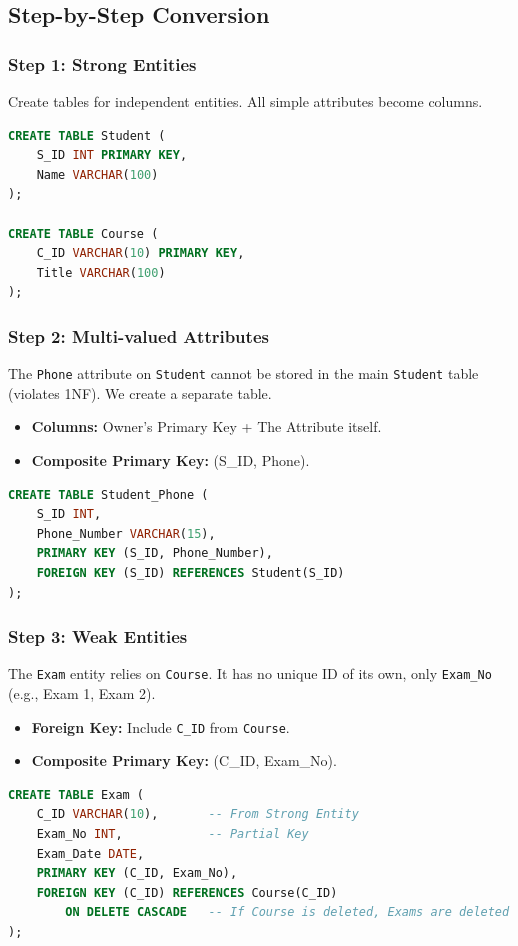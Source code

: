 \documentclass[12pt,a4paper]{article}
\begin{document}
\subsection{Step-by-Step Conversion}

\subsubsection{Step 1: Strong Entities}
Create tables for independent entities. All simple attributes become columns.
\begin{lstlisting}[language=SQL]
CREATE TABLE Student (
    S_ID INT PRIMARY KEY,
    Name VARCHAR(100)
);

CREATE TABLE Course (
    C_ID VARCHAR(10) PRIMARY KEY,
    Title VARCHAR(100)
);
\end{lstlisting}

\subsubsection{Step 2: Multi-valued Attributes}
The \texttt{Phone} attribute on \texttt{Student} cannot be stored in the main \texttt{Student} table (violates 1NF). We create a separate table.
\begin{itemize}
    \item \textbf{Columns:} Owner's Primary Key + The Attribute itself.
    \item \textbf{Composite Primary Key:} (S\_ID, Phone).
\end{itemize}
\begin{lstlisting}[language=SQL]
CREATE TABLE Student_Phone (
    S_ID INT,
    Phone_Number VARCHAR(15),
    PRIMARY KEY (S_ID, Phone_Number),
    FOREIGN KEY (S_ID) REFERENCES Student(S_ID)
);
\end{lstlisting}

\subsubsection{Step 3: Weak Entities}
The \texttt{Exam} entity relies on \texttt{Course}. It has no unique ID of its own, only \texttt{Exam\_No} (e.g., Exam 1, Exam 2).
\begin{itemize}
    \item \textbf{Foreign Key:} Include \texttt{C\_ID} from \texttt{Course}.
    \item \textbf{Composite Primary Key:} (C\_ID, Exam\_No).
\end{itemize}
\begin{lstlisting}[language=SQL]
CREATE TABLE Exam (
    C_ID VARCHAR(10),       -- From Strong Entity
    Exam_No INT,            -- Partial Key
    Exam_Date DATE,
    PRIMARY KEY (C_ID, Exam_No),
    FOREIGN KEY (C_ID) REFERENCES Course(C_ID) 
        ON DELETE CASCADE   -- If Course is deleted, Exams are deleted
);
\end{lstlisting}
\end{document}
